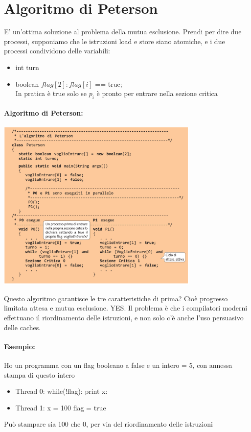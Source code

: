 \documentclass[12pt, a4paper, openany, twoside]{book}
\begin{document}
\section{Algoritmo di Peterson}
E' un'ottima soluzione al problema della mutua esclusione. Prendi per dire due 
processi, supponiamo che le istruzioni load e store siano atomiche, e i due processi 
condividono delle variabili:
\begin{itemize}
	\item int turn
	\item boolean $flag[2]:flag[i]$ == true; \\
	In pratica è true solo se $p_{i}$ è pronto per entrare nella sezione critica
\end{itemize}
\paragraph{Algoritmo di Peterson: }
\begin{center}
	\includegraphics[width=0.75\textwidth]{1}
\end{center}
Questo algoritmo garantisce le tre caratteristiche di prima? Cioè progresso
limitata attesa e mutua esclusione. YES.
Il problema è che i compilatori moderni effettuano il riordinamento delle 
istruzioni, e non solo c'è anche l'uso persuasivo delle caches.
\paragraph{Esempio: }
Ho un programma con un flag booleano a false e un intero = 5, con annessa
stampa di questo intero
\begin{itemize}
	\item Thread 0: while(!flag): print x:
	\item Thread 1: x = 100 flag = true
\end{itemize}
Può stampare sia 100 che 0, per via del riordinamento delle istruzioni
    
\end{document}
